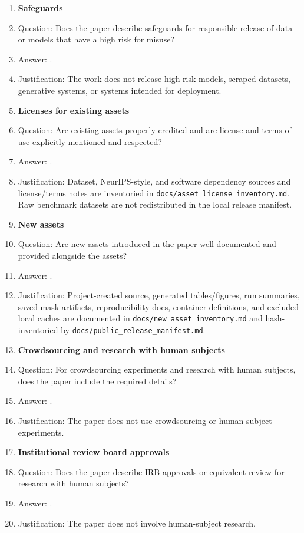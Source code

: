 \begin{enumerate}
\item {\bf Safeguards}
    \item[] Question: Does the paper describe safeguards for responsible release of data or models that have a high risk for misuse?
    \item[] Answer: \answerNA{}.
    \item[] Justification: The work does not release high-risk models, scraped datasets, generative systems, or systems intended for deployment.

\item {\bf Licenses for existing assets}
    \item[] Question: Are existing assets properly credited and are license and terms of use explicitly mentioned and respected?
    \item[] Answer: \answerYes{}.
    \item[] Justification: Dataset, NeurIPS-style, and software dependency sources and license/terms notes are inventoried in \texttt{docs/asset\_license\_inventory.md}. Raw benchmark datasets are not redistributed in the local release manifest.

\item {\bf New assets}
    \item[] Question: Are new assets introduced in the paper well documented and provided alongside the assets?
    \item[] Answer: \answerYes{}.
    \item[] Justification: Project-created source, generated tables/figures, run summaries, saved mask artifacts, reproducibility docs, container definitions, and excluded local caches are documented in \texttt{docs/new\_asset\_inventory.md} and hash-inventoried by \texttt{docs/public\_release\_manifest.md}.

\item {\bf Crowdsourcing and research with human subjects}
    \item[] Question: For crowdsourcing experiments and research with human subjects, does the paper include the required details?
    \item[] Answer: \answerNA{}.
    \item[] Justification: The paper does not use crowdsourcing or human-subject experiments.

\item {\bf Institutional review board approvals}
    \item[] Question: Does the paper describe IRB approvals or equivalent review for research with human subjects?
    \item[] Answer: \answerNA{}.
    \item[] Justification: The paper does not involve human-subject research.


\end{enumerate}
